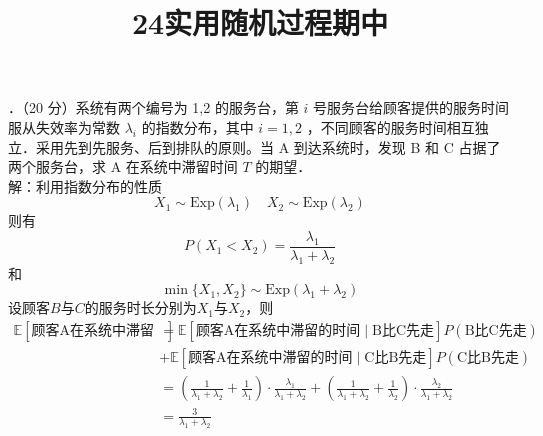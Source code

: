 \documentclass[UTF8]{ctexart}
\title{24实用随机过程期中}
\author{\textcalligra{NULIOUS}}
\date{}
\begin{document}
\maketitle
{}．（20 分）系统有两个编号为 1,2 的服务台，第 $i$ 号服务台给顾客提供的服务时间服从失效率为常数 $\lambda_{i}$ 的指数分布，其中 $i=1,2$ ，不同顾客的服务时间相互独立．采用先到先服务、后到排队的原则。当 A 到达系统时，发现 B 和 C 占据了两个服务台，求 A 在系统中滞留时间 $T$ 的期望．\\
解：利用指数分布的性质
\[
X_1\sim \mathrm{Exp}(\lambda_1) \quad X_2\sim \mathrm{Exp}(\lambda_2) 
\]
则有
\[
P(X_1<X_2)=\frac{\lambda_1}{\lambda_1+\lambda_2}
\]
和
\[
\min\{X_1,X_2\} \sim \mathrm{Exp}(\lambda_1+\lambda_2)
\]
设顾客$B$与$C$的服务时长分别为$X_1$与$X_2$，则
\begin{align*}
	\mathbb{E}\left[\text{顾客A在系统中滞留的时间} \right]  &= \mathbb{E}\left[\text{顾客A在系统中滞留的时间}\mid \text{B比C先走} \right]P(\text{B比C先走})\\
	&+\mathbb{E}\left[\text{顾客A在系统中滞留的时间}\mid \text{C比B先走} \right]P(\text{C比B先走}) \\
	& = \left(\frac{1}{\lambda_1+\lambda_2}+\frac{1}{\lambda_1} \right)\cdot \frac{\lambda_1}{\lambda_1+\lambda_2}+ \left(\frac{1}{\lambda_1+\lambda_2}+\frac{1}{\lambda_2} \right)\cdot \frac{\lambda_2}{\lambda_1+\lambda_2}\\
	&=\frac{3}{\lambda_1+\lambda_2}
\end{align*}\\
\end{document}
